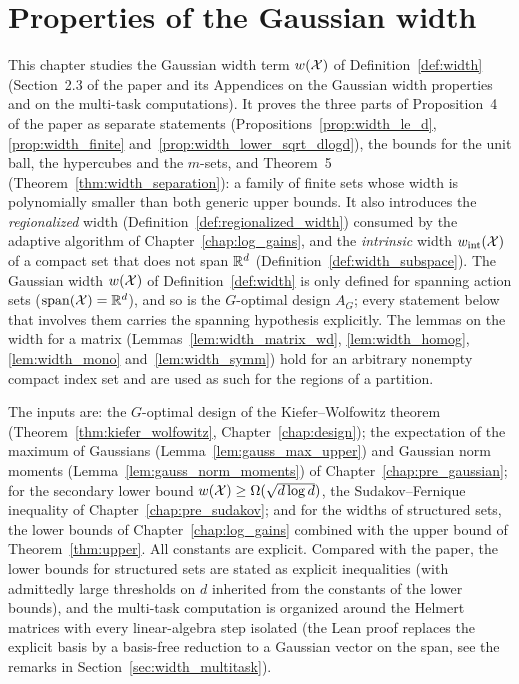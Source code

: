 \chapter{Properties of the Gaussian width}
\label{chap:width}

This chapter studies the Gaussian width term $w(\mathcal{X})$ of Definition~\ref{def:width}
(Section~2.3 of the paper and its Appendices on the Gaussian width properties and on the
multi-task computations). It proves the three parts of Proposition~4 of the paper as
separate statements (Propositions~\ref{prop:width_le_d}, \ref{prop:width_finite}
and~\ref{prop:width_lower_sqrt_dlogd}), the bounds for the unit ball, the hypercubes and the
$m$-sets, and Theorem~5 (Theorem~\ref{thm:width_separation}): a family of finite sets whose
width is polynomially smaller than both generic upper bounds. It also introduces the
\emph{regionalized} width (Definition~\ref{def:regionalized_width}) consumed by the adaptive
algorithm of Chapter~\ref{chap:log_gains}, and the \emph{intrinsic} width
$w_{\mathrm{int}}(\mathcal{X})$ of a compact set that does not span $\mathbb{R}^d$
(Definition~\ref{def:width_subspace}). The Gaussian width $w(\mathcal{X})$ of
Definition~\ref{def:width} is only defined for spanning action sets
($\operatorname{span}(\mathcal{X}) = \mathbb{R}^d$), and so is the $G$-optimal design $A_G$; every statement below that
involves them carries the spanning hypothesis explicitly. The lemmas on the width for a
matrix (Lemmas~\ref{lem:width_matrix_wd}, \ref{lem:width_homog}, \ref{lem:width_mono}
and~\ref{lem:width_symm}) hold for an arbitrary nonempty compact index set and are used as
such for the regions of a partition.

The inputs are: the $G$-optimal design of the Kiefer--Wolfowitz theorem
(Theorem~\ref{thm:kiefer_wolfowitz}, Chapter~\ref{chap:design}); the expectation of the
maximum of Gaussians (Lemma~\ref{lem:gauss_max_upper}) and Gaussian norm moments
(Lemma~\ref{lem:gauss_norm_moments}) of Chapter~\ref{chap:pre_gaussian}; for the secondary
lower bound $w(\mathcal{X}) \ge \Omega(\sqrt{d \log d})$, the Sudakov--Fernique inequality of
Chapter~\ref{chap:pre_sudakov}; and for the widths of structured sets, the lower bounds of
Chapter~\ref{chap:log_gains} combined with the upper bound of Theorem~\ref{thm:upper}. All
constants are explicit. Compared with the paper, the lower bounds for structured sets are
stated as explicit inequalities (with admittedly large thresholds on $d$ inherited from the
constants of the lower bounds), and the multi-task computation is organized around the
Helmert matrices with every linear-algebra step isolated (the Lean proof replaces the explicit
basis by a basis-free reduction to a Gaussian vector on the span, see the remarks in
Section~\ref{sec:width_multitask}).

